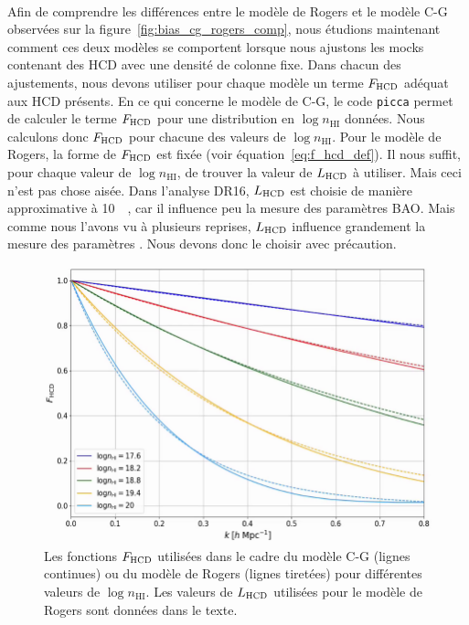\paragraph{}
Afin de comprendre les différences entre le modèle de Rogers et le modèle C-G observées sur la figure~\ref{fig:bias_cg_rogers_comp},
nous étudions maintenant comment ces deux modèles se comportent lorsque nous ajustons les mocks contenant des HCD avec une densité de colonne fixe.
Dans chacun des ajustements, nous devons utiliser pour chaque modèle un terme $F_{\textsc{HCD}}$ adéquat aux HCD présents.
En ce qui concerne le modèle de C-G, le code \texttt{picca} permet de calculer le terme $F_{\textsc{HCD}}$ pour une distribution en $\log n_{\mathrm{HI}}$ données. Nous calculons donc $F_{\textsc{HCD}}$ pour chacune des valeurs de $\log n_{\mathrm{HI}}$.
Pour le modèle de Rogers, la forme de $F_{\textsc{HCD}}$ est fixée (voir équation~\ref{eq:f_hcd_def}). Il nous suffit, pour chaque valeur de $\log n_{\mathrm{HI}}$, de trouver la valeur de $L_{\textsc{HCD}}$ à utiliser. Mais ceci n'est pas chose aisée. Dans l'analyse DR16, $L_{\textsc{HCD}}$ est choisie de manière approximative à \SI{10}{\perh\Mpc}, car il influence peu la mesure des paramètres BAO.
Mais comme nous l'avons vu à plusieurs reprises, $L_{\textsc{HCD}}$ influence grandement la mesure des paramètres \lya{}. Nous devons donc le choisir avec précaution.

\begin{figure}
  \centering
  \includegraphics[scale=0.4]{f_hcd_fixed}
  \caption{Les fonctions $F_{\textsc{HCD}}$ utilisées dans le cadre du modèle C-G (lignes continues) ou du modèle de Rogers (lignes tiretées) pour différentes valeurs de $\log n_{\mathrm{HI}}$. Les valeurs de  $L_{\textsc{HCD}}$ utilisées pour le modèle de Rogers sont données dans le texte.
}
  \label{fig:f_hcd_fixed}
\end{figure}

